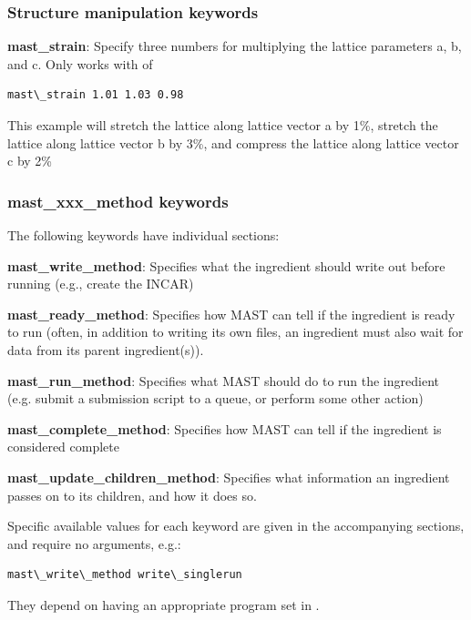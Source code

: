 \documentclass[letterpaper,10pt,english]{sphinxmanual}
\begin{document}
\subsubsection{Structure manipulation keywords}
\label{3_1_2_ingredients:structure-manipulation-keywords}
\textbf{mast\_strain}: Specify three numbers for multiplying the lattice parameters a, b, and c. Only works with  of 

\begin{Verbatim}[commandchars=\\\{\}]
mast\_strain 1.01 1.03 0.98
\end{Verbatim}

This example will stretch the lattice along lattice vector a by 1\%, stretch the lattice along lattice vector b by 3\%, and compress the lattice along lattice vector c by 2\%


\subsubsection{mast\_xxx\_method keywords}
\label{3_1_2_ingredients:mast-xxx-method-keywords}
The following keywords have individual sections:

\textbf{mast\_write\_method}: Specifies what the ingredient should write out before running (e.g., create the INCAR)

\textbf{mast\_ready\_method}: Specifies how MAST can tell if the ingredient is ready to run (often, in addition to writing its own files, an ingredient must also wait for data from its parent ingredient(s)).

\textbf{mast\_run\_method}: Specifies what MAST should do to run the ingredient (e.g. submit a submission script to a queue, or perform some other action)

\textbf{mast\_complete\_method}: Specifies how MAST can tell if the ingredient is considered complete

\textbf{mast\_update\_children\_method}: Specifies what information an ingredient passes on to its children, and how it does so.

Specific available values for each keyword are given in the accompanying sections, and require no arguments, e.g.:

\begin{Verbatim}[commandchars=\\\{\}]
mast\_write\_method write\_singlerun
\end{Verbatim}

They depend on having an appropriate program set in .
\end{document}
